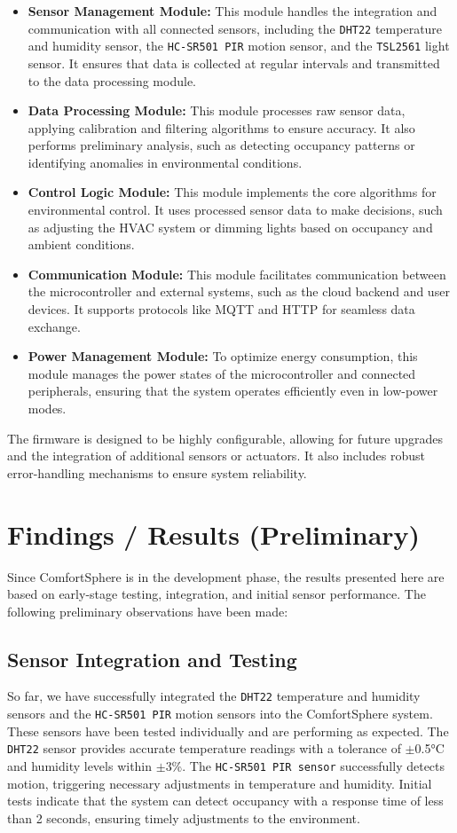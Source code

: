 \documentclass[a4paper]{scrartcl}
\begin{document}
\begin{itemize}
	\item \textbf{Sensor Management Module:} This module handles the integration and communication with all connected sensors, including the \texttt{DHT22} temperature and humidity sensor, the \texttt{HC-SR501 PIR} motion sensor, and the \texttt{TSL2561} light sensor. It ensures that data is collected at regular intervals and transmitted to the data processing module.
	\item \textbf{Data Processing Module:} This module processes raw sensor data, applying calibration and filtering algorithms to ensure accuracy. It also performs preliminary analysis, such as detecting occupancy patterns or identifying anomalies in environmental conditions.
	\item \textbf{Control Logic Module:} This module implements the core algorithms for environmental control. It uses processed sensor data to make decisions, such as adjusting the HVAC system or dimming lights based on occupancy and ambient conditions.
	\item \textbf{Communication Module:} This module facilitates communication between the microcontroller and external systems, such as the cloud backend and user devices. It supports protocols like MQTT and HTTP for seamless data exchange.
	\item \textbf{Power Management Module:} To optimize energy consumption, this module manages the power states of the microcontroller and connected peripherals, ensuring that the system operates efficiently even in low-power modes.
\end{itemize}

The firmware is designed to be highly configurable, allowing for future upgrades and the integration of additional sensors or actuators. It also includes robust error-handling mechanisms to ensure system reliability.

\section{Findings / Results (Preliminary)}
Since ComfortSphere is in the development phase, the results presented here are based on early-stage testing, integration, and initial sensor performance. The following preliminary observations have been made:

\subsection{Sensor Integration and Testing}  
So far, we have successfully integrated the \texttt{DHT22} temperature and humidity sensors and the \texttt{HC-SR501 PIR} motion sensors into the ComfortSphere system. These sensors have been tested individually and are performing as expected. The \texttt{DHT22} sensor provides accurate temperature readings with a tolerance of $\pm$0.5°C and humidity levels within $\pm$3\%. The \texttt{HC-SR501 PIR sensor} successfully detects motion, triggering necessary adjustments in temperature and humidity. Initial tests indicate that the system can detect occupancy with a response time of less than 2 seconds, ensuring timely adjustments to the environment.
\end{document}
